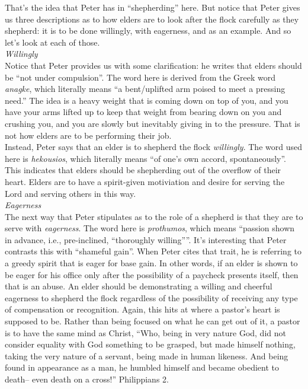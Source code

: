 \documentclass[letterpaper, 12pt]{article}
\begin{document}
    That's the idea that Peter has in ``shepherding'' here. But notice
    that Peter gives us three descriptions as to how elders are to look
    after the flock carefully as they shepherd: it is to be done
    willingly, with eagerness, and as an example. And so let's look at
    each of those. \\

    \noindent \emph{Willingly} \\

    Notice that Peter provides us with some clarification: he writes
    that elders should be ``not under compulsion''.  The word here is
    derived from the Greek word \emph{anagke}, which literally means ``a
    bent/uplifted arm poised to meet a pressing need.''  The idea is a
    heavy weight that is coming down on top of you, and you have your
    arms lifted up to keep that weight from bearing down on you and
    crushing you, and you are slowly but inevitably giving in to the
    pressure. That is not how elders are to be performing their job. \\
    
    Instead, Peter says that an elder is to shepherd the flock
    \emph{willingly}.  The word used here is \emph{hekousios}, which
    literally means ``of one's own accord, spontaneously''.  This
    indicates that elders should be shepherding out of the overflow of
    their heart. Elders are to have a spirit-given motiviation and
    desire for serving the Lord and serving others in this way. \\

    \noindent \emph{Eagerness} \\

    The next way that Peter stipulates as to the role of a shepherd is
    that they are to serve with \emph{eagerness}.  The word here is
    \emph{prothumos}, which means ``passion shown in advance, i.e.,
    pre-inclined, ``thoroughly willing''''.  It's interesting that Peter
    contrasts this with ``shameful gain''.  When Peter cites that trait,
    he is referring to a greedy spirit that is eager for base gain.  In
    other words, if an elder is shown to be eager for his office only
    after the possibility of a paycheck presents itself, then that is an
    abuse.  An elder should be demonstrating a willing and cheerful
    eagerness to shepherd the flock regardless of the possibility of
    receiving any type of compensation or recognition. Again, this hits
    at where a pastor's heart is supposed to be. Rather than being
    focused on what he can get out of it, a pastor is to have the same
    mind as Christ, ``Who, being in very nature God, did not consider
    equality with God something to be grasped, but made himself nothing,
    taking the very nature of a servant, being made in human likeness.
    And being found in appearance as a man, he humbled himself and
    became obedient to death-- even death on a cross!'' Philippians 2.
    \\
\end{document}
